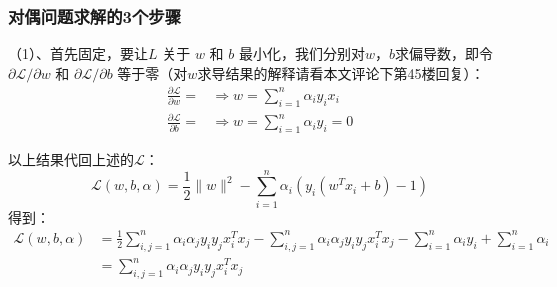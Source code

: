 \documentclass[a4paper,12pt]{article}
\begin{document}
\subsubsection{对偶问题求解的3个步骤}
（1）、首先固定，要让$ L$ 关于 $w$ 和 $b$ 最小化，我们分别对$w$，$b$求偏导数，即令 $\partial\mathcal{L}/\partial w$ 和 $\partial\mathcal{L}/\partial b$ 等于零（对$w$求导结果的解释请看本文评论下第45楼回复）：
\begin{equation}
  \begin{split}
    \frac{\partial\mathcal{L}}{\partial w}= &\Rightarrow w=\sum_{i=1}^n\alpha_iy_ix_i\\
    \frac{\partial\mathcal{L}}{\partial b}= &\Rightarrow w=\sum_{i=1}^n\alpha_iy_i=0
  \end{split}
\end{equation}

以上结果代回上述的$\mathcal{L}$：
\begin{equation}
  \mathcal{L}(w,b,\alpha)=\frac{1}{2}\|w\|^2-\sum_{i=1}^n\alpha_i\left(y_i(w^Tx_i+b)-1\right)
\end{equation}
得到：
\begin{equation}
  \begin{split}
    \mathcal{L}(w,b,\alpha)&=\frac{1}{2}\sum_{i,j=1}^n\alpha_i\alpha_jy_iy_jx_i^Tx_j-\sum_{i,j=1}^n\alpha_i\alpha_jy_iy_jx_i^Tx_j-\sum_{i=1}^n\alpha_iy_i+\sum_{i=1}^n\alpha_i\\
    &=\sum_{i,j=1}^n\alpha_i\alpha_jy_iy_jx_i^Tx_j
  \end{split}
\end{equation}
\end{document}

